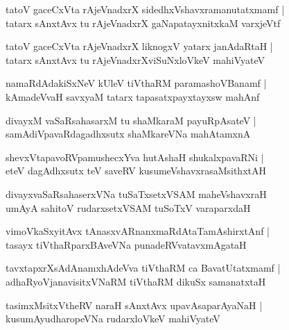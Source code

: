 \documentclass[twoside,12pt,openright]{book}
\newcounter{shloka}[chapter]
\begin{document}
\begin{shloka}
tatoV gaceCxVta rAjeVnadxrX sidedhxVshavxramanutatxmamf |\\
tatarx sAnxtAvx tu rAjeVnadxrX gaNapatayxnitxkaM varxjeVtf 
\end{shloka}

\begin{shloka}
tatoV gaceCxVta rAjeVnadxrX liknogxV yatarx janAdaRtaH |\\
tatarx sAnxtAvx tu rAjeVnadxrXviSuNxloVkeV mahiVyateV
\end{shloka}

\begin{shloka}
namaRdAdakiSxNeV kUleV tiVthaRM paramashoVBanamf |\\
kAmadeVvaH savxyaM tatarx tapasatxpayxtayxsw mahAnf
\end{shloka}

\begin{shloka}
divayxM vaSaRsahasarxM tu shaMkaraM payuRpAsateV |\\
samAdiVpavaRdagadhxsutx shaMkareVNa mahAtamxnA 
\end{shloka}

\begin{shloka}
shevxVtapavoRVpamushecxYva hutAshaH shukalxpavaRNi |\\
eteV dagAdhxsutx teV saveRV kusumeVshavxrasaMsithxtAH 
\end{shloka}

\begin{shloka}
divayxvaSaRsahaserxVNa tuSaTxsetxVSAM maheVshavxraH  \\
umAyA sahitoV rudarxsetxVSAM tuSoTxV varaparxdaH 
\end{shloka}

\begin{shloka}
vimoVkaSxyitAvx tAnasxvARnanxmaRdAtaTamAshirxtAnf |\\
tasayx tiVthaRparxBAveVNa punadeRVvatavxmAgataH 
\end{shloka}

\begin{shloka}
tavxtapxrXsAdAnamxhAdeVva tiVthaRM ca BavatUtatxmamf |\\
adhaRyoVjanavisitxVNaRM tiVthaRM dikuSx samanatxtaH 
\end{shloka}

\begin{shloka}
tasimxMsitxVtheRV naraH sAnxtAvx upavAsaparAyaNaH |\\
kusumAyudharopeVNa rudarxloVkeV mahiVyateV 
\end{shloka}
\end{document}
